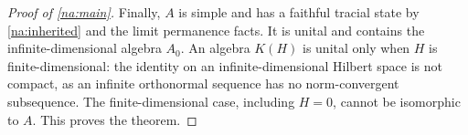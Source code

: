\begin{proof}[Proof of \cref{na:main}]
Finally, $A$ is simple and has a faithful tracial state by
\cref{na:inherited} and the limit permanence facts. It is unital
and contains the infinite-dimensional algebra $A_0$. An algebra
$K(H)$ is unital only when $H$ is finite-dimensional:
the identity on an infinite-dimensional Hilbert space is not
compact, as an infinite orthonormal sequence has no norm-convergent
subsequence. The finite-dimensional case, including $H=0$, cannot
be isomorphic to $A$. This proves the theorem.
\end{proof}
